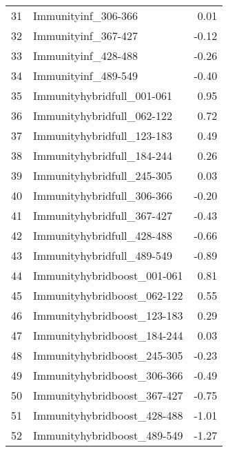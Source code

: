 \begin{table}[ht]
\begin{tabular}{rlr}
  31 & Immunityinf\_306-366 & 0.01 \\ 
  32 & Immunityinf\_367-427 & -0.12 \\ 
  33 & Immunityinf\_428-488 & -0.26 \\ 
  34 & Immunityinf\_489-549 & -0.40 \\ 
  35 & Immunityhybridfull\_001-061 & 0.95 \\ 
  36 & Immunityhybridfull\_062-122 & 0.72 \\ 
  37 & Immunityhybridfull\_123-183 & 0.49 \\ 
  38 & Immunityhybridfull\_184-244 & 0.26 \\ 
  39 & Immunityhybridfull\_245-305 & 0.03 \\ 
  40 & Immunityhybridfull\_306-366 & -0.20 \\ 
  41 & Immunityhybridfull\_367-427 & -0.43 \\ 
  42 & Immunityhybridfull\_428-488 & -0.66 \\ 
  43 & Immunityhybridfull\_489-549 & -0.89 \\ 
  44 & Immunityhybridboost\_001-061 & 0.81 \\ 
  45 & Immunityhybridboost\_062-122 & 0.55 \\ 
  46 & Immunityhybridboost\_123-183 & 0.29 \\ 
  47 & Immunityhybridboost\_184-244 & 0.03 \\ 
  48 & Immunityhybridboost\_245-305 & -0.23 \\ 
  49 & Immunityhybridboost\_306-366 & -0.49 \\ 
  50 & Immunityhybridboost\_367-427 & -0.75 \\ 
  51 & Immunityhybridboost\_428-488 & -1.01 \\ 
  52 & Immunityhybridboost\_489-549 & -1.27 \\ 
   \hline
\end{tabular}
\end{table}
